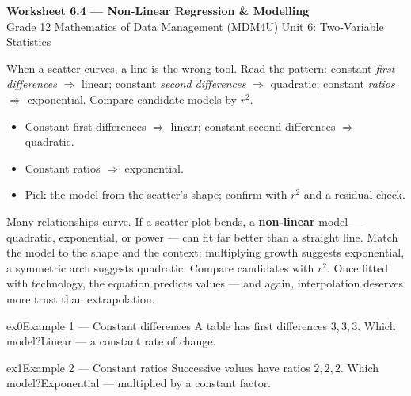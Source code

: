\documentclass[11pt]{article}
\begin{document}
\begin{center}
{\LARGE\bfseries\color{titleblue}Worksheet 6.4 --- Non-Linear Regression \& Modelling}\\[2pt]
{\small Grade 12 Mathematics of Data Management (MDM4U) \textperiodcentered{} Unit 6: Two-Variable Statistics}
\end{center}

\begin{ideabox}
When a scatter curves, a line is the wrong tool. Read the pattern: constant \emph{first differences} $\Rightarrow$ linear; constant \emph{second differences} $\Rightarrow$ quadratic; constant \emph{ratios} $\Rightarrow$ exponential. Compare candidate models by $r^{2}$.
\begin{itemize}[leftmargin=*,itemsep=2pt]
  \item Constant first differences $\Rightarrow$ linear; constant second differences $\Rightarrow$ quadratic.
  \item Constant ratios $\Rightarrow$ exponential.
  \item Pick the model from the scatter's shape; confirm with $r^{2}$ and a residual check.
\end{itemize}
\end{ideabox}

\begin{learnbox}
Many relationships curve. If a scatter plot bends, a \textbf{non-linear} model — quadratic, exponential, or power — can fit far better than a straight line.
Match the model to the shape and the context: multiplying growth suggests exponential, a symmetric arch suggests quadratic. Compare candidates with $r^2$.
Once fitted with technology, the equation predicts values — and again, interpolation deserves more trust than extrapolation.
\end{learnbox}


\begin{example}{ex0}{Example 1 --- Constant differences}
A table has first differences $3,3,3$. Which model?\soln Linear --- a constant rate of change.
\end{example}

\begin{example}{ex1}{Example 2 --- Constant ratios}
Successive values have ratios $2,2,2$. Which model?\soln Exponential --- multiplied by a constant factor.
\end{example}
\end{document}
